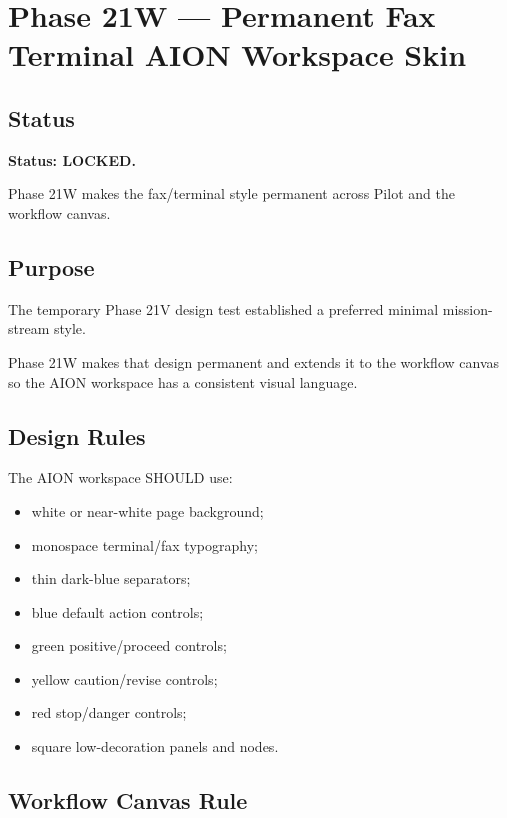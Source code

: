\section{Phase 21W --- Permanent Fax Terminal AION Workspace Skin}
\label{sec:aion-phase21w-permanent-fax-terminal-workspace-skin}

\subsection{Status}

\textbf{Status: LOCKED.}

Phase 21W makes the fax/terminal style permanent across Pilot and the workflow canvas.

\subsection{Purpose}

The temporary Phase 21V design test established a preferred minimal mission-stream style.

Phase 21W makes that design permanent and extends it to the workflow canvas so the AION workspace has a consistent visual language.

\subsection{Design Rules}

The AION workspace SHOULD use:

\begin{itemize}
  \item white or near-white page background;
  \item monospace terminal/fax typography;
  \item thin dark-blue separators;
  \item blue default action controls;
  \item green positive/proceed controls;
  \item yellow caution/revise controls;
  \item red stop/danger controls;
  \item square low-decoration panels and nodes.
\end{itemize}

\subsection{Workflow Canvas Rule}

